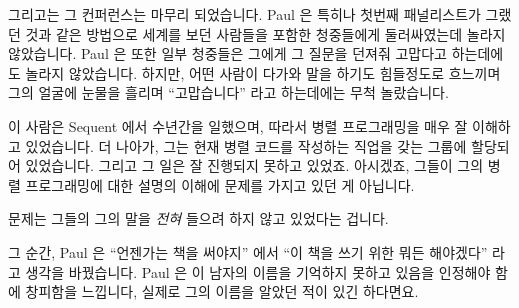 그리고는 그 컨퍼런스는 마무리 되었습니다.
Paul 은 특히나 첫번째 패널리스트가 그랬던 것과 같은 방법으로 세계를 보던
사람들을 포함한 청중들에게 둘러싸였는데 놀라지 않았습니다.
Paul 은 또한 일부 청중들은 그에게 그 질문을 던져줘 고맙다고 하는데에도 놀라지
않았습니다.
하지만, 어떤 사람이 다가와 말을 하기도 힘들정도로 흐느끼며 그의 얼굴에 눈물을
흘리며 ``고맙습니다'' 라고 하는데에는 무척 놀랐습니다.

이 사람은 Sequent 에서 수년간을 일했으며, 따라서 병렬 프로그래밍을 매우 잘
이해하고 있었습니다.
더 나아가, 그는 현재 병렬 코드를 작성하는 직업을 갖는 그룹에 할당되어
있었습니다.
그리고 그 일은 잘 진행되지 못하고 있었죠.
아시겠죠, 그들이 그의 병렬 프로그래밍에 대한 설명의 이해에 문제를 가지고 있던
게 아닙니다.

문제는 그들의 그의 말을 \emph{전혀} 들으려 하지 않고 있었다는 겁니다.

그 순간, Paul 은 ``언젠가는 책을 써야지'' 에서 ``이 책을 쓰기 위한 뭐든
해야겠다'' 라고 생각을 바꿨습니다.
Paul 은 이 남자의 이름을 기억하지 못하고 있음을 인정해야 함에 창피함을
느낍니다, 실제로 그의 이름을 알았던 적이 있긴 하다면요.

